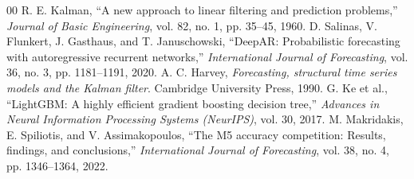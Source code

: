 \documentclass[conference]{IEEEtran}
\begin{document}
\begin{thebibliography}{00}
 R. E. Kalman, ``A new approach to linear filtering and prediction problems,'' \textit{Journal of Basic Engineering}, vol. 82, no. 1, pp. 35--45, 1960.
 D. Salinas, V. Flunkert, J. Gasthaus, and T. Januschowski, ``DeepAR: Probabilistic forecasting with autoregressive recurrent networks,'' \textit{International Journal of Forecasting}, vol. 36, no. 3, pp. 1181--1191, 2020.
 A. C. Harvey, \textit{Forecasting, structural time series models and the Kalman filter}. Cambridge University Press, 1990.
 G. Ke et al., ``LightGBM: A highly efficient gradient boosting decision tree,'' \textit{Advances in Neural Information Processing Systems (NeurIPS)}, vol. 30, 2017.
 M. Makridakis, E. Spiliotis, and V. Assimakopoulos, ``The M5 accuracy competition: Results, findings, and conclusions,'' \textit{International Journal of Forecasting}, vol. 38, no. 4, pp. 1346--1364, 2022.
\end{thebibliography}
\end{document}
